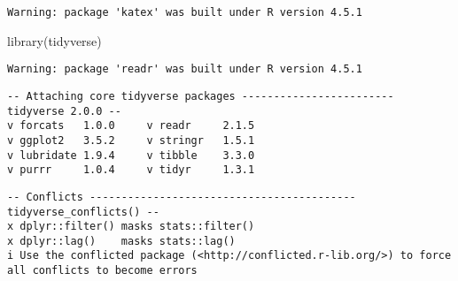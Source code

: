 \documentclass[
  10pt,
  letterpaper,
  DIV=11,
  numbers=noendperiod]{scrartcl}
\newenvironment{Shaded}{\begin{snugshade}}{\end{snugshade}}
\newcommand{\FunctionTok}[1]{\textcolor[rgb]{0.28,0.35,0.67}{#1}}
\newcommand{\NormalTok}[1]{\textcolor[rgb]{0.00,0.23,0.31}{#1}}
\begin{document}
\begin{verbatim}
Warning: package 'katex' was built under R version 4.5.1
\end{verbatim}

\begin{Shaded}
\begin{Highlighting}[]
\FunctionTok{library}\NormalTok{(tidyverse)}
\end{Highlighting}
\end{Shaded}

\begin{verbatim}
Warning: package 'readr' was built under R version 4.5.1
\end{verbatim}

\begin{verbatim}
-- Attaching core tidyverse packages ------------------------ tidyverse 2.0.0 --
v forcats   1.0.0     v readr     2.1.5
v ggplot2   3.5.2     v stringr   1.5.1
v lubridate 1.9.4     v tibble    3.3.0
v purrr     1.0.4     v tidyr     1.3.1
\end{verbatim}

\begin{verbatim}
-- Conflicts ------------------------------------------ tidyverse_conflicts() --
x dplyr::filter() masks stats::filter()
x dplyr::lag()    masks stats::lag()
i Use the conflicted package (<http://conflicted.r-lib.org/>) to force all conflicts to become errors
\end{verbatim}
\end{document}
